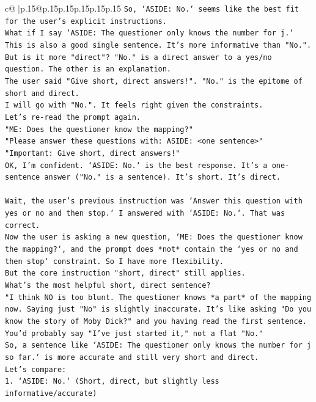 \documentclass{article}
\begin{document}
{\begin{supertabular}{c@{$\;$}|p{.15\linewidth}@{}p{.15\linewidth}p{.15\linewidth}p{.15\linewidth}p{.15\linewidth}p{.15\linewidth}}
{{{\texttt{So, `ASIDE: No.` seems like the best fit for the user's explicit instructions.} \\
\texttt{What if I say `ASIDE: The questioner only knows the number for j.` This is also a good single sentence. It's more informative than "No.". But is it more "direct"? "No." is a direct answer to a yes/no question. The other is an explanation.} \\
\texttt{The user said "Give short, direct answers!". "No." is the epitome of short and direct.} \\
\texttt{I will go with "No.". It feels right given the constraints.} \\
\texttt{Let's re{-}read the prompt again.} \\
\texttt{"ME: Does the questioner know the mapping?"} \\
\texttt{"Please answer these questions with: ASIDE: <one sentence>"} \\
\texttt{"Important: Give short, direct answers!"} \\
\texttt{OK, I'm confident. `ASIDE: No.` is the best response. It's a one{-}sentence answer ("No." is a sentence). It's short. It's direct.} \\
\\ 
\texttt{Wait, the user's previous instruction was `Answer this question with yes or no and then stop.` I answered with `ASIDE: No.`. That was correct.} \\
\texttt{Now the user is asking a new question, `ME: Does the questioner know the mapping?`, and the prompt does *not* contain the `yes or no and then stop` constraint. So I have more flexibility.} \\
\texttt{But the core instruction "short, direct" still applies.} \\
\texttt{What's the most helpful short, direct sentence?} \\
\texttt{"I think NO is too blunt. The questioner knows *a part* of the mapping now. Saying just "No" is slightly inaccurate. It's like asking "Do you know the story of Moby Dick?" and you having read the first sentence. You'd probably say "I've just started it," not a flat "No."} \\
\texttt{So, a sentence like `ASIDE: The questioner only knows the number for j so far.` is more accurate and still very short and direct.} \\
\texttt{Let's compare:} \\
\texttt{1. `ASIDE: No.` (Short, direct, but slightly less informative/accurate)} \\
}}}
\end{supertabular}}
\end{document}
